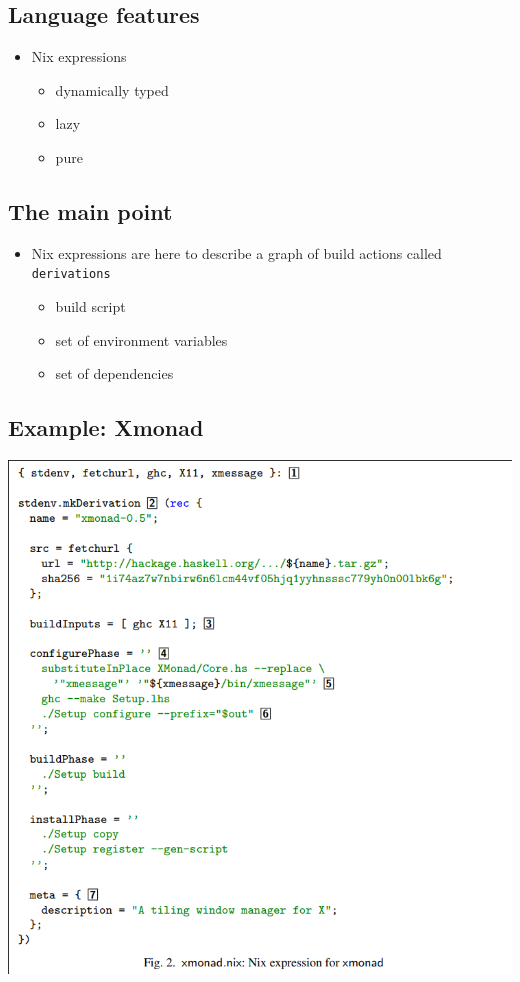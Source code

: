 \documentclass[11pt]{article}
\begin{document}
\subsection{Language features}
\label{sec:org726a984}
\begin{itemize}
\item Nix expressions
\begin{itemize}
\item dynamically typed
\item lazy
\item pure
\end{itemize}
\end{itemize}
\subsection{The main point}
\label{sec:orgc8a7d80}
\begin{itemize}
\item Nix expressions are here to describe a graph of build actions
called \texttt{derivations}
\begin{itemize}
\item build script
\item set of environment variables
\item set of dependencies
\end{itemize}
\end{itemize}
\subsection{Example: Xmonad}
\label{sec:orgf84f6cb}
\begin{center}
\includegraphics[width=.9\linewidth]{./images/screenshot-06.png}
\end{center}
\end{document}
